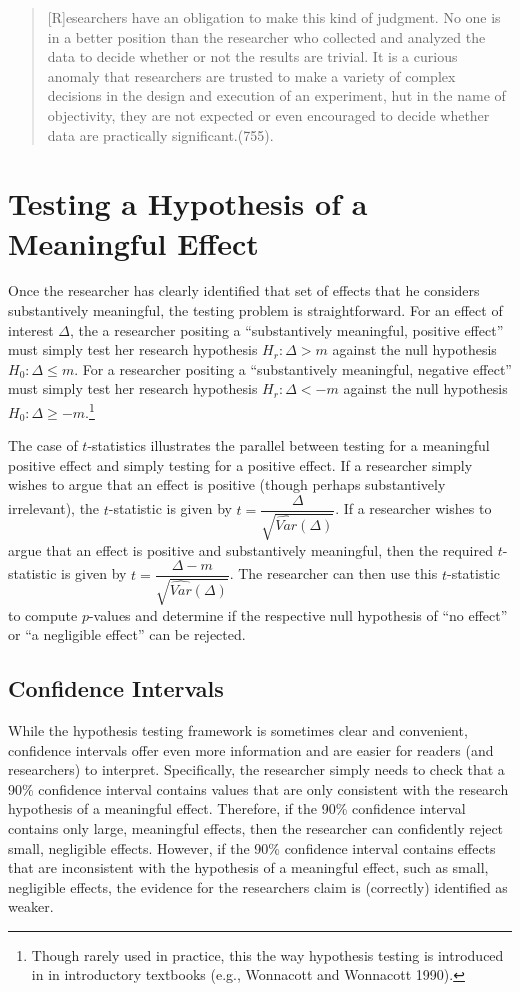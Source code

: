 \documentclass[12pt]{article}
\begin{document}
\begin{quote}
[R]esearchers have an obligation to make this kind of judgment. No one is in a better position than the researcher who collected and analyzed the data to decide whether or not the results are trivial. It is a curious anomaly that researchers are trusted to make a variety of complex decisions in the design and execution of an experiment, hut in the name of objectivity, they are not expected or even encouraged to decide whether data are practically significant.(755).
\end{quote}

\section*{Testing a Hypothesis of a Meaningful Effect}

Once the researcher has clearly identified that set of effects that he considers substantively meaningful, the testing problem is straightforward. For an effect of interest $\Delta$, the a researcher positing a ``substantively meaningful, positive effect'' must simply test her research hypothesis $H_r: \Delta > m$ against the null hypothesis $H_0: \Delta \leq m$. For a researcher positing a ``substantively meaningful, negative effect'' must simply test her research hypothesis $H_r: \Delta < -m$ against the null hypothesis $H_0: \Delta \geq -m$.\footnote{Though rarely used in practice, this the way hypothesis testing is introduced in in introductory textbooks (e.g., Wonnacott and Wonnacott 1990).}

The case of $t$-statistics illustrates the parallel between testing for a meaningful positive effect and simply testing for a positive effect. If a researcher simply wishes to argue that an effect is positive (though perhaps substantively irrelevant), the $t$-statistic is given by $t = \dfrac{\Delta}{\sqrt{\widehat{Var}(\Delta)}}$. If a researcher wishes to argue that an effect is positive and substantively meaningful, then the required $t$-statistic is given by $t = \dfrac{\Delta - m}{\sqrt{\widehat{Var}(\Delta)}}$. The researcher can then use this $t$-statistic to compute $p$-values and determine if the respective null hypothesis of ``no effect'' or ``a negligible effect'' can be rejected.

\subsection*{Confidence Intervals}

While the hypothesis testing framework is sometimes clear and convenient, confidence intervals offer even more information and are easier for readers (and researchers) to interpret. Specifically, the researcher simply needs to check that a 90\% confidence interval contains values that are only consistent with the research hypothesis of a meaningful effect. Therefore, if the 90\% confidence interval contains only large, meaningful effects, then the researcher can confidently reject small, negligible effects. However, if the 90\% confidence interval contains effects that are inconsistent with the hypothesis of a meaningful effect, such as small, negligible effects, the evidence for the researchers claim is (correctly) identified as weaker. 
\end{document}
